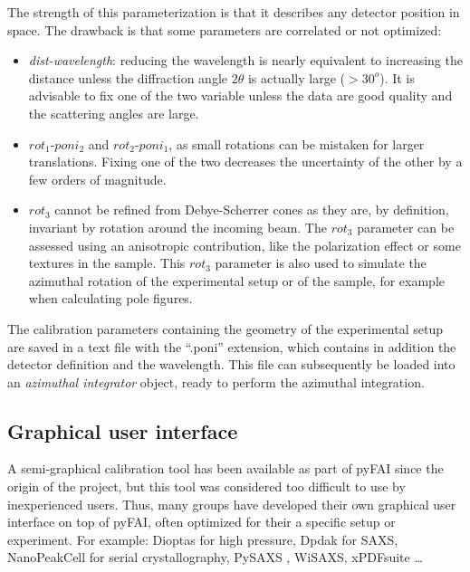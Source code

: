 \documentclass[preprint]{iucr}              %
\begin{document}
The strength of this parameterization is that it describes any detector position in
space. 
The drawback is that some parameters are correlated or not optimized:

\begin{itemize}
  \item \textit{dist-wavelength}: reducing the wavelength is nearly equivalent
  to increasing the distance unless the diffraction angle $2\theta$ is actually
  large ($>30^o$). 
  It is advisable to fix one of the two variable unless the data are good
  quality and the scattering angles are large.
  \item $rot_1$-$poni_2$ and $rot_2$-$poni_1$, as small rotations can be
  mistaken for larger translations. 
  Fixing one of the two decreases the uncertainty of the other by a few orders of
  magnitude.
  \item $rot_3$ cannot be refined from Debye-Scherrer cones as they are, by definition,
  invariant by rotation around the incoming beam. The $rot_3$ parameter can be
   assessed using an anisotropic contribution, like the polarization effect or
  some  textures in the sample.
  This $rot_3$ parameter is also used to simulate the azimuthal rotation of
  the experimental setup or of the sample, for example when calculating pole
  figures.
\end{itemize}
 

The calibration parameters containing the geometry of the experimental setup are saved in a text file with the ``.poni''
extension, which contains in addition the detector definition and the wavelength.
This file can subsequently be loaded into an \textit{azimuthal integrator}
object, ready to perform the azimuthal integration.

\subsection{Graphical user interface}

A semi-graphical calibration tool has been available as part of pyFAI
\cite{fv5028} since the origin of the project, but this tool was considered too
difficult to use by inexperienced users.
Thus, many groups have developed their own graphical user interface on top of
pyFAI, often optimized for their a specific setup or experiment.
For example: Dioptas \cite{diopta_publi} for high pressure, Dpdak \cite{dpdak}
for SAXS, NanoPeakCell \cite{nanopeakcell} for serial crystallography,
PySAXS \cite{pysaxs}, WiSAXS, xPDFsuite \cite{xpdfsuite}\ldots
\end{document}
